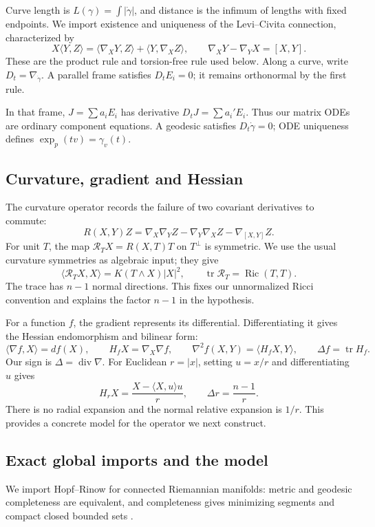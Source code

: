 \documentclass[12pt,reqno]{amsart}
\begin{document}
Curve length is \(L(\gamma)=\int|\dot\gamma|\), and distance is the infimum of lengths with fixed endpoints. We import existence and uniqueness of the Levi--Civita connection, characterized by
\[
X\langle Y,Z\rangle=\langle\nabla_XY,Z\rangle+\langle Y,\nabla_XZ\rangle,
\qquad \nabla_XY-\nabla_YX=[X,Y].
\]
These are the product rule and torsion-free rule used below. Along a curve, write \(D_t=\nabla_{\dot\gamma}\). A parallel frame satisfies \(D_tE_i=0\); it remains orthonormal by the first rule.

In that frame, \(J=\sum a_iE_i\) has derivative \(D_tJ=\sum a_i'E_i\). Thus our matrix ODEs are ordinary component equations. A geodesic satisfies \(D_t\dot\gamma=0\); ODE uniqueness defines \(\exp_p(tv)=\gamma_v(t)\).

\subsection{Curvature, gradient and Hessian}
The curvature operator records the failure of two covariant derivatives to commute:
\[
R(X,Y)Z=\nabla_X\nabla_YZ-\nabla_Y\nabla_XZ-\nabla_{[X,Y]}Z.
\]
For unit \(T\), the map \(\mathcal R_T X=R(X,T)T\) on \(T^\perp\) is symmetric. We use the usual curvature symmetries as algebraic input; they give
\[
\langle\mathcal R_TX,X\rangle=K(T\wedge X)|X|^2,
\qquad \operatorname{tr}\mathcal R_T=\operatorname{Ric}(T,T).
\]
The trace has \(n-1\) normal directions. This fixes our unnormalized Ricci convention and explains the factor \(n-1\) in the hypothesis.

For a function \(f\), the gradient represents its differential. Differentiating it gives the Hessian endomorphism and bilinear form:
\[
\langle\nabla f,X\rangle=df(X),\qquad
H_fX=\nabla_X\nabla f,\qquad
\nabla^2f(X,Y)=\langle H_fX,Y\rangle,\qquad \Delta f=\operatorname{tr}H_f.
\]
Our sign is \(\Delta=\operatorname{div}\nabla\). For Euclidean \(r=|x|\), setting \(u=x/r\) and differentiating \(u\) gives
\[
H_rX=\frac{X-\langle X,u\rangle u}{r},\qquad \Delta r=\frac{n-1}{r}.
\]
There is no radial expansion and the normal relative expansion is \(1/r\). This provides a concrete model for the operator we next construct.

\subsection{Exact global imports and the model}
We import Hopf--Rinow for connected Riemannian manifolds: metric and geodesic completeness are equivalent, and completeness gives minimizing segments and compact closed bounded sets \cite[Section 8]{S-Bishop-2013v2}.
\end{document}
